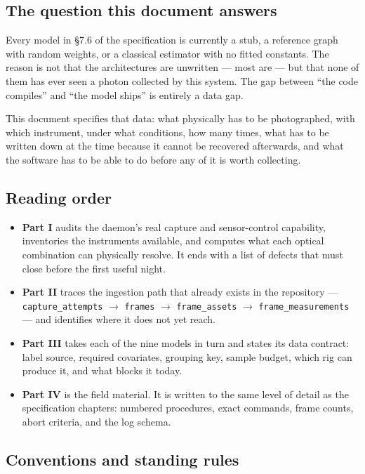 \documentclass[11pt]{article}
\newcommand{\co}[1]{\texttt{\small #1}}
\begin{document}
\subsection{The question this document answers}

Every model in \S7.6 of the specification is currently a stub, a reference graph
with random weights, or a classical estimator with no fitted constants. The
reason is not that the architectures are unwritten --- most are --- but that
none of them has ever seen a photon collected by this system. The gap between
``the code compiles'' and ``the model ships'' is entirely a data gap.

This document specifies that data: what physically has to be photographed, with
which instrument, under what conditions, how many times, what has to be written
down at the time because it cannot be recovered afterwards, and what the
software has to be able to do before any of it is worth collecting.

\subsection{Reading order}

\begin{itemize}
\item \textbf{Part I} audits the daemon's real capture and sensor-control
      capability, inventories the instruments available, and computes what each
      optical combination can physically resolve. It ends with a list of defects
      that must close before the first useful night.
\item \textbf{Part II} traces the ingestion path that already exists in the
      repository --- \co{capture\_attempts} $\rightarrow$ \co{frames}
      $\rightarrow$ \co{frame\_assets} $\rightarrow$ \co{frame\_measurements}
      --- and identifies where it does not yet reach.
\item \textbf{Part III} takes each of the nine models in turn and states its
      data contract: label source, required covariates, grouping key, sample
      budget, which rig can produce it, and what blocks it today.
\item \textbf{Part IV} is the field material. It is written to the same level of
      detail as the specification chapters: numbered procedures, exact commands,
      frame counts, abort criteria, and the log schema.
\end{itemize}

\subsection{Conventions and standing rules}
\end{document}
